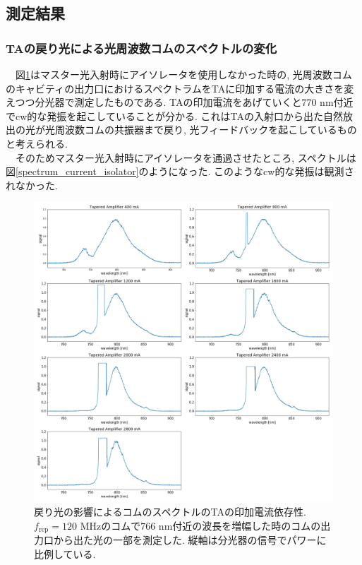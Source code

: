 \documentclass[uplatex, dvipdfmx, a4paper, report, papersize, 11pt]{jsbook}
\begin{document}
\subsection{測定結果}
\subsubsection{TAの戻り光による光周波数コムのスペクトルの変化}
　図\ref{spectrum_current_MODORI}はマスター光入射時にアイソレータを使用しなかった時の, 光周波数コムのキャビティの出力口におけるスペクトラムをTAに印加する電流の大きさを変えつつ分光器で測定したものである. TAの印加電流をあげていくと$770$ nm付近でcw的な発振を起こしていることが分かる. これはTAの入射口から出た自然放出の光が光周波数コムの共振器まで戻り, 光フィードバックを起こしているものと考えられる. \\
　そのためマスター光入射時にアイソレータを通過させたところ, スペクトルは図\ref{spectrum_current_isolator}のようになった. このようなcw的な発振は観測されなかった.
\begin{figure}[H]
 \begin{center}
  \includegraphics[width=140mm]{figures/chapter4/spectrum_current_MODORI.png}
\end{center}
 \caption{戻り光の影響によるコムのスペクトルのTAの印加電流依存性. $f_{\mathrm{rep}} = 120$ MHzのコムで$766$ nm付近の波長を増幅した時のコムの出力口から出た光の一部を測定した. 縦軸は分光器の信号でパワーに比例している.}
 \label{spectrum_current_MODORI}
\end{figure}
\end{document}
